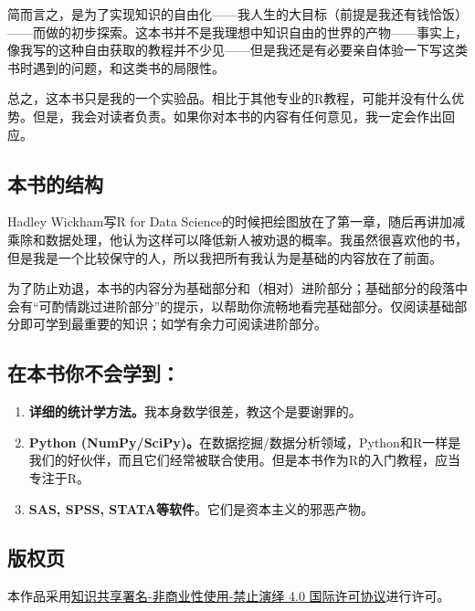 \documentclass[]{book}
\providecommand{\tightlist}{%
  \setlength{\itemsep}{0pt}\setlength{\parskip}{0pt}}
\begin{document}
简而言之，是为了实现知识的自由化------我人生的大目标（前提是我还有钱恰饭）------而做的初步探索。这本书并不是我理想中知识自由的世界的产物------事实上，像我写的这种自由获取的教程并不少见------但是我还是有必要亲自体验一下写这类书时遇到的问题，和这类书的局限性。

总之，这本书只是我的一个实验品。相比于其他专业的R教程，可能并没有什么优势。但是，我会对读者负责。如果你对本书的内容有任何意见，我一定会作出回应。

\hypertarget{structure}{%
\subsection*{本书的结构}\label{structure}}

Hadley Wickham写R for Data Science的时候把绘图放在了第一章，随后再讲加减乘除和数据处理，他认为这样可以降低新人被劝退的概率。我虽然很喜欢他的书，但是我是一个比较保守的人，所以我把所有我认为是基础的内容放在了前面。

为了防止劝退，本书的内容分为基础部分和（相对）进阶部分；基础部分的段落中会有``可酌情跳过进阶部分''的提示，以帮助你流畅地看完基础部分。仅阅读基础部分即可学到最重要的知识；如学有余力可阅读进阶部分。

\hypertarget{no}{%
\subsection*{在本书你不会学到：}\label{no}}

\begin{enumerate}
\def\labelenumi{\arabic{enumi}.}
\tightlist
\item
  \textbf{详细的统计学方法。}我本身数学很差，教这个是要谢罪的。
\item
  \textbf{Python (NumPy/SciPy)。}在数据挖掘/数据分析领域，Python和R一样是我们的好伙伴，而且它们经常被联合使用。但是本书作为R的入门教程，应当专注于R。
\item
  \textbf{SAS, SPSS, STATA等软件}。它们是资本主义的邪恶产物。
\end{enumerate}

\hypertarget{colophon}{%
\subsection*{版权页}\label{colophon}}

\doclicenseThis

本作品采用\href{https://creativecommons.org/licenses/by-nc-nd/4.0/deed.zh}{知识共享署名-非商业性使用-禁止演绎 4.0 国际许可协议}进行许可。
\end{document}
